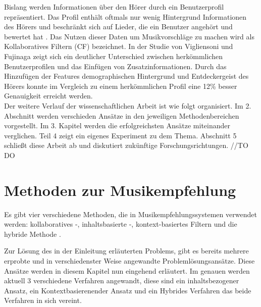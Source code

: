 \documentclass[twosided,a4,10pt]{article}
\begin{document}
\begin{multicols}{2}
Bislang werden Informationen über den Hörer durch ein Benutzerprofil repräsentiert. Das Profil enthält oftmals nur wenig Hintergrund Informationen des Hörers und beschränkt sich auf Lieder, die ein Benutzer angehört und bewertet hat \cite{oord}. Das Nutzen dieser Daten um Musikvorschläge zu machen wird als Kollaboratives Filtern (CF) bezeichnet. In der Studie von Vigliensoni und Fujinaga \cite{vigliensoni} zeigt sich ein deutlicher Unterschied zwischen herkömmlichen Benutzerprofilen und das Einfügen von Zusatzinformationen. Durch das Hinzufügen der Features demographischen Hintergrund und Entdeckergeist des Hörers konnte im Vergleich zu einem herkömmlichen Profil eine 12\% besser Genauigkeit erreicht werden.\newline\\
Der weitere Verlauf der wissenschaftlichen Arbeit ist wie folgt organisiert. Im 2. Abschnitt werden verschieden Ansätze in den jeweiligen Methodenbereichen vorgestellt. Im 3. Kapitel werden die erfolgreichsten Ansätze miteinander verglichen. Teil 4 zeigt ein eigenes Experiment zu dem Thema. Abschnitt 5 schließt diese Arbeit ab und diskutiert zukünftige Forschungsrichtungen. //TO DO

\section{Methoden zur Musikempfehlung}
Es gibt vier verschiedene Methoden, die in Musikempfehlungssystemen verwendet werden: kollaboratives -, inhaltsbasierte -, kontext-basiertes Filtern und die hybride Methode \cite{kaitila}.

Zur Lösung des in der Einleitung erläuterten Problems, gibt es bereits mehrere erprobte und in verschiedenster Weise angewandte Problemlösungsansätze. Diese Ansätze werden in diesem Kapitel nun eingehend erläutert. Im genauen werden aktuell 3 verschiedene Verfahren angewandt, diese sind ein inhaltsbezogener Ansatz, ein Kontextbasierenender Ansatz und ein Hybrides Verfahren das beide Verfahren in sich vereint.


\end{multicols}
\end{document}
